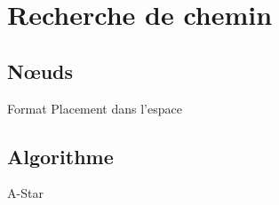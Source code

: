 \section{Recherche de chemin}

\subsection{Nœuds}
Format
Placement dans l'espace

\subsection{Algorithme}
A-Star